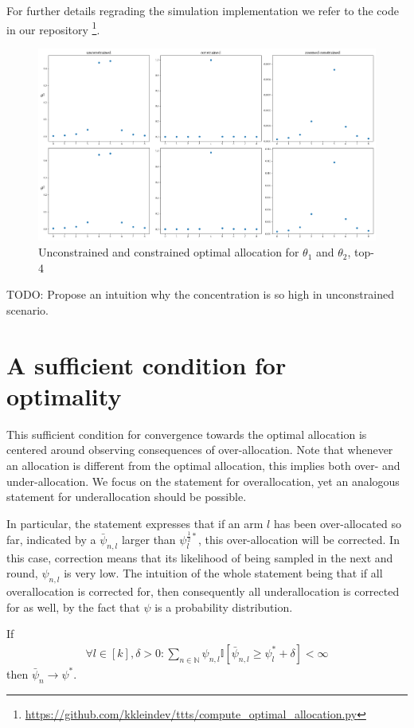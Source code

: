 For further details regrading the simulation implementation we refer to the code in our repository \footnote{\url{https://github.com/kkleindev/ttts/compute_optimal_allocation.py}}.

\begin{figure}[h]
  \centering
  \includegraphics[width=\textwidth]{optimal_allocation.png}
  \caption{Unconstrained and constrained optimal allocation for $\theta_1$ and $\theta_2$, top-4}
  \label{fig:optimal_allocation}
\end{figure}

TODO: Propose an intuition why the concentration is so high in unconstrained scenario.

\section{A sufficient condition for optimality}\label{section:optimality_sufficient_condition}
This sufficient condition for convergence towards the optimal allocation is centered around observing consequences of over-allocation. Note that whenever an allocation is different from the optimal allocation, this implies both over- and under-allocation. We focus on the statement for overallocation, yet an analogous statement for underallocation should be possible.

In particular, the statement expresses that if an arm $l$ has been over-allocated so far, indicated by a $\bar{\psi}_{n, l}$ larger than $\psi^{\frac{1}{2}*}_l$, this over-allocation will be corrected. In this case, correction means that its likelihood of being sampled in the next and round, $\psi_{n, l}$ is very low. The intuition of the whole statement being that if all overallocation is corrected for, then consequently all underallocation is corrected for as well, by the fact that $\psi$ is a probability distribution.
\begin{proposition}\label{proposition:optimality_sufficient_condition}
  If
  \begin{align}
    \forall l \in [k], \delta > 0: \sum_{n \in \mathbb{N}} \psi_{n, l} \mathbb{I}[\bar{\psi}_{n, l} \geq \psi^*_l + \delta] < \infty \label{eq:sufficient_condition}
  \end{align}
  then $\bar{\psi}_{n} \rightarrow \psi^*$.
\end{proposition}

